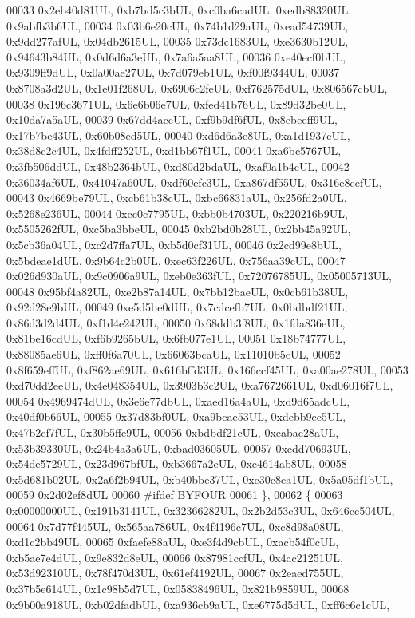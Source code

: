 \begin{DoxyCode}
00033     0x2eb40d81UL, 0xb7bd5c3bUL, 0xc0ba6cadUL, 0xedb88320UL, 0x9abfb3b6UL,
00034     0x03b6e20cUL, 0x74b1d29aUL, 0xead54739UL, 0x9dd277afUL, 0x04db2615UL,
00035     0x73dc1683UL, 0xe3630b12UL, 0x94643b84UL, 0x0d6d6a3eUL, 0x7a6a5aa8UL,
00036     0xe40ecf0bUL, 0x9309ff9dUL, 0x0a00ae27UL, 0x7d079eb1UL, 0xf00f9344UL,
00037     0x8708a3d2UL, 0x1e01f268UL, 0x6906c2feUL, 0xf762575dUL, 0x806567cbUL,
00038     0x196c3671UL, 0x6e6b06e7UL, 0xfed41b76UL, 0x89d32be0UL, 0x10da7a5aUL,
00039     0x67dd4accUL, 0xf9b9df6fUL, 0x8ebeeff9UL, 0x17b7be43UL, 0x60b08ed5UL,
00040     0xd6d6a3e8UL, 0xa1d1937eUL, 0x38d8c2c4UL, 0x4fdff252UL, 0xd1bb67f1UL,
00041     0xa6bc5767UL, 0x3fb506ddUL, 0x48b2364bUL, 0xd80d2bdaUL, 0xaf0a1b4cUL,
00042     0x36034af6UL, 0x41047a60UL, 0xdf60efc3UL, 0xa867df55UL, 0x316e8eefUL,
00043     0x4669be79UL, 0xcb61b38cUL, 0xbc66831aUL, 0x256fd2a0UL, 0x5268e236UL,
00044     0xcc0c7795UL, 0xbb0b4703UL, 0x220216b9UL, 0x5505262fUL, 0xc5ba3bbeUL,
00045     0xb2bd0b28UL, 0x2bb45a92UL, 0x5cb36a04UL, 0xc2d7ffa7UL, 0xb5d0cf31UL,
00046     0x2cd99e8bUL, 0x5bdeae1dUL, 0x9b64c2b0UL, 0xec63f226UL, 0x756aa39cUL,
00047     0x026d930aUL, 0x9c0906a9UL, 0xeb0e363fUL, 0x72076785UL, 0x05005713UL,
00048     0x95bf4a82UL, 0xe2b87a14UL, 0x7bb12baeUL, 0x0cb61b38UL, 0x92d28e9bUL,
00049     0xe5d5be0dUL, 0x7cdcefb7UL, 0x0bdbdf21UL, 0x86d3d2d4UL, 0xf1d4e242UL,
00050     0x68ddb3f8UL, 0x1fda836eUL, 0x81be16cdUL, 0xf6b9265bUL, 0x6fb077e1UL,
00051     0x18b74777UL, 0x88085ae6UL, 0xff0f6a70UL, 0x66063bcaUL, 0x11010b5cUL,
00052     0x8f659effUL, 0xf862ae69UL, 0x616bffd3UL, 0x166ccf45UL, 0xa00ae278UL,
00053     0xd70dd2eeUL, 0x4e048354UL, 0x3903b3c2UL, 0xa7672661UL, 0xd06016f7UL,
00054     0x4969474dUL, 0x3e6e77dbUL, 0xaed16a4aUL, 0xd9d65adcUL, 0x40df0b66UL,
00055     0x37d83bf0UL, 0xa9bcae53UL, 0xdebb9ec5UL, 0x47b2cf7fUL, 0x30b5ffe9UL,
00056     0xbdbdf21cUL, 0xcabac28aUL, 0x53b39330UL, 0x24b4a3a6UL, 0xbad03605UL,
00057     0xcdd70693UL, 0x54de5729UL, 0x23d967bfUL, 0xb3667a2eUL, 0xc4614ab8UL,
00058     0x5d681b02UL, 0x2a6f2b94UL, 0xb40bbe37UL, 0xc30c8ea1UL, 0x5a05df1bUL,
00059     0x2d02ef8dUL
00060 \textcolor{preprocessor}{#ifdef BYFOUR}
00061   \},
00062   \{
00063     0x00000000UL, 0x191b3141UL, 0x32366282UL, 0x2b2d53c3UL, 0x646cc504UL,
00064     0x7d77f445UL, 0x565aa786UL, 0x4f4196c7UL, 0xc8d98a08UL, 0xd1c2bb49UL,
00065     0xfaefe88aUL, 0xe3f4d9cbUL, 0xacb54f0cUL, 0xb5ae7e4dUL, 0x9e832d8eUL,
00066     0x87981ccfUL, 0x4ac21251UL, 0x53d92310UL, 0x78f470d3UL, 0x61ef4192UL,
00067     0x2eaed755UL, 0x37b5e614UL, 0x1c98b5d7UL, 0x05838496UL, 0x821b9859UL,
00068     0x9b00a918UL, 0xb02dfadbUL, 0xa936cb9aUL, 0xe6775d5dUL, 0xff6c6c1cUL,

\end{DoxyCode}
